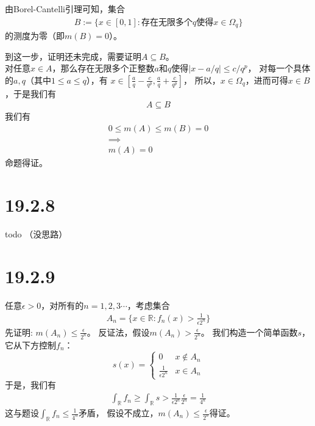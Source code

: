 \documentclass{article}
\begin{document}
由Borel-Cantelli引理可知，集合
\begin{align*}
  B := \{x \in [0, 1]: \text{存在无限多个$q$使得$x \in \Omega_q$}\}
\end{align*}
的测度为零（即$m(B) = 0$）。

到这一步，证明还未完成，需要证明$A \subseteq B$。\\
对任意$x \in A$，那么存在无限多个正整数$a$和$q$使得$|x - a/q| \leq c/q^p$，
对每一个具体的$a, q$（其中$1 \leq a \leq q$），有
$x \in [\frac{a}{q} - \frac{c}{q^p}, \frac{a}{q} + \frac{c}{q^p}]$，
所以，$x \in \Omega_q$，进而可得$x \in B$，于是我们有
\begin{align*}
  A \subseteq B
\end{align*}
我们有
\begin{align*}
  0 \leq m(A) \leq m(B) = 0 \\
  \implies                  \\
  m(A) = 0
\end{align*}
命题得证。

\section*{19.2.8}



todo （没思路）

\section*{19.2.9}

任意$\epsilon > 0$，对所有的$n = 1, 2, 3 \cdots$，考虑集合
\begin{align*}
  A_n = \{x \in \mathbb{R}: f_n(x) > \frac{1}{\epsilon 2^n}\}
\end{align*}
先证明: $m(A_n) \leq \frac{\epsilon}{2^n}$。
反证法，假设$m(A_n) > \frac{\epsilon}{2^n}$。
我们构造一个简单函数$s$，它从下方控制$f_n$：
\begin{equation*}
  s(x) = \begin{cases}
    0                      & x \notin A_n \\
    \frac{1}{\epsilon 2^n} & x \in A_n
  \end{cases}
\end{equation*}
于是，我们有
\begin{align*}
  \int_{\mathbb{R}} f_n \geq \int_{\mathbb{R}} s > \frac{1}{\epsilon 2^n} \frac{\epsilon}{2^n} = \frac{1}{4^n}
\end{align*}
这与题设$\int_{\mathbb{R}} f_n \leq \frac{1}{4^n}$矛盾，
假设不成立，$m(A_n) \leq \frac{\epsilon}{2^n}$得证。
\end{document}
